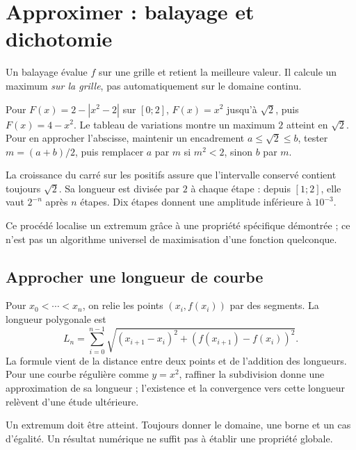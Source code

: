 \documentclass[../cours_2de.tex]{subfiles}
\begin{document}
\section{Approximer : balayage et dichotomie}
Un balayage évalue $f$ sur une grille et retient la meilleure valeur. Il calcule un maximum \emph{sur la grille}, pas automatiquement sur le domaine continu.
\begin{exemple}
Pour $F(x)=2-|x^2-2|$ sur $[0;2]$, $F(x)=x^2$ jusqu'à $\sqrt2$, puis $F(x)=4-x^2$.
Le tableau de variations montre un maximum $2$ atteint en $\sqrt2$.
Pour en approcher l'abscisse, maintenir un encadrement $a\leq\sqrt2\leq b$, tester $m=(a+b)/2$, puis remplacer $a$ par $m$ si $m^2<2$, sinon $b$ par $m$.
\end{exemple}
\begin{demonstration}
La croissance du carré sur les positifs assure que l'intervalle conservé contient toujours $\sqrt2$.
Sa longueur est divisée par $2$ à chaque étape : depuis $[1;2]$, elle vaut $2^{-n}$ après $n$ étapes. Dix étapes donnent une amplitude inférieure à $10^{-3}$.
\end{demonstration}
Ce procédé localise un extremum grâce à une propriété spécifique démontrée ; ce n'est pas un algorithme universel de maximisation d'une fonction quelconque.
\begin{finchapitre}
\section{Approcher une longueur de courbe}
Pour $x_0<\cdots<x_n$, on relie les points $(x_i,f(x_i))$ par des segments. La longueur polygonale est
\[
L_n=\sum_{i=0}^{n-1}\sqrt{(x_{i+1}-x_i)^2+(f(x_{i+1})-f(x_i))^2}.
\]
La formule vient de la distance entre deux points et de l'addition des longueurs. Pour une courbe régulière comme $y=x^2$, raffiner la subdivision donne une approximation de sa longueur ; l'existence et la convergence vers cette longueur relèvent d'une étude ultérieure.
\begin{retenir}
Un extremum doit être atteint. Toujours donner le domaine, une borne et un cas d'égalité. Un résultat numérique ne suffit pas à établir une propriété globale.
\end{retenir}
\end{finchapitre}
\end{document}
